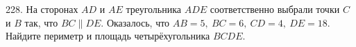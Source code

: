228. На сторонах $AD$ и $AE$ треугольника $ADE$ соответственно выбрали точки $C$ и $B$ так, что $BC\parallel DE.$ Оказалось, что $AB=5,\ BC=6,\ CD=4,\ DE=18.$ Найдите периметр и площадь четырёхугольника $BCDE.$\\
